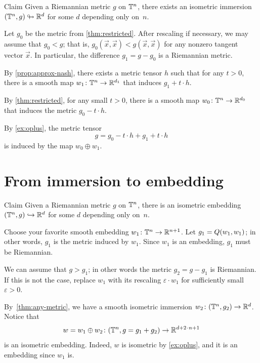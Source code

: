 \begin{thm}{Claim}\label{thm:any-metric}
Given a Riemannian metric $g$ on $\mathbb{T}^n$, there exists an isometric immersion $(\mathbb{T}^n, g) \looparrowright \mathbb{R}^d$ for some $d$ depending only on~$n$.
\end{thm}

Let $g_0$ be the metric from \ref{thm:restricted}.
After rescaling if necessary, we may assume that $g_0<g$; that is, $g_0(\vec x,\vec x)<g(\vec x,\vec x)$ for any nonzero tangent vector $\vec x$.
In particular, the difference $g_1=g-g_0$ is a Riemannian metric.

By \ref{prop:approx-nash}, there exists a metric tensor $h$ such that for any $t>0$, there is a smooth map $w_1\colon\mathbb{T}^n\to \mathbb{R}^{d_1}$ that induces $g_1+t\cdot h$.

By \ref{thm:restricted}, for any small $t>0$, there is a smooth map $w_0\colon\mathbb{T}^n\to \mathbb{R}^{d_0}$ that induces the metric $g_0-t \cdot h$.

By \ref{ex:oplus}, the metric tensor
\[g=g_0-t\cdot h+g_1+t\cdot h\]
is induced by the map $w_0\oplus w_1$.
\qeds

\section{From immersion to embedding}\label{thm:embedding}

\begin{thm}{Claim}\label{clm:embedding}
Given a Riemannian metric $g$ on $\mathbb{T}^n$, there is an isometric embedding $(\mathbb{T}^n,g)\hookrightarrow\mathbb{R}^d$ for some $d$ depending only on~$n$.
\end{thm}

Choose your favorite smooth embedding $w_1\colon\mathbb{T}^n\to \mathbb{R}^{n+1}$.
Let $g_1\z=Q(w_1,w_1)$; in other words, $g_1$ is the metric induced by $w_1$.
Since $w_1$ is an embedding, $g_1$ must be Riemannian.

We can assume that $g>g_1$; in other words the metric $g_2=g-g_1$ is Riemannian.
If this is not the case, replace $w_1$ with its rescaling $\varepsilon \cdot w_1$ for sufficiently small $\varepsilon > 0$.

By~\ref{thm:any-metric}, we have a smooth isometric immersion $w_2\colon(\mathbb{T}^n,g_2)\to \mathbb{R}^d$.
Notice that
\[w=w_1\oplus w_2\colon (\TT^n,g=g_1+g_2)\to \RR^{d+2\cdot n+1}\]
is an isometric embedding.
Indeed, $w$ is isometric by \ref{ex:oplus}, and it is an embedding since $w_1$ is.
\qeds

